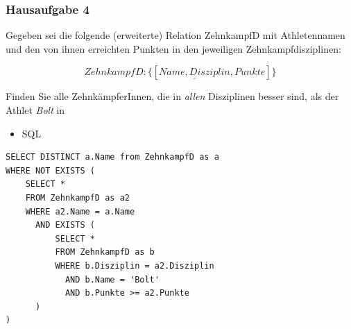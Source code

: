 \begin{frame}[fragile]
	\frametitle{Hausaufgabe 4}
	\vspace{0.5cm}

	\begin{multicols}{2}
		Gegeben sei die folgende (erweiterte) Relation ZehnkampfD mit 
		Athletennamen und den von ihnen erreichten Punkten in den jeweiligen Zehnkampfdisziplinen:

		\[ ZehnkampfD: \{[ \underline{Name, Disziplin}, Punkte ]\} \]

		Finden Sie alle ZehnkämpferInnen, die in \textit{allen} Disziplinen besser sind,
		als der Athlet \textit{Bolt} in
		\begin{itemize}
			\item SQL
		\end{itemize}
		\vfill\columnbreak

		\begin{verbatim}
SELECT DISTINCT a.Name from ZehnkampfD as a
WHERE NOT EXISTS (
	SELECT *
	FROM ZehnkampfD as a2
	WHERE a2.Name = a.Name
	  AND EXISTS (
		  SELECT *
		  FROM ZehnkampfD as b
		  WHERE b.Disziplin = a2.Disziplin
			AND b.Name = 'Bolt'
			AND b.Punkte >= a2.Punkte
	  )
)
		\end{verbatim}
	\end{multicols}
\end{frame}
